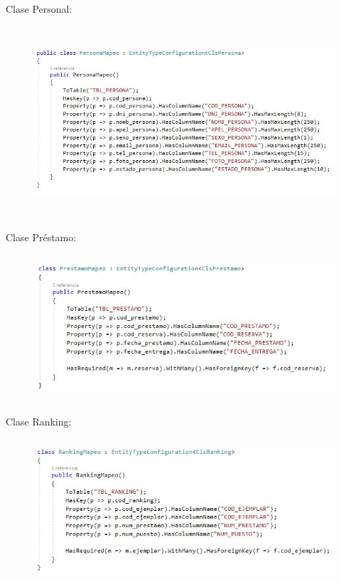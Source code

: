 \documentclass[12pt]{article}
\begin{document}
\begin{enumerate}[label*=\arabic*.]
\begin{enumerate}[label*=\arabic*.]
Clase Personal:
\begin{figure}[H]
	\begin{Center}
		\includegraphics[width=5.91in,height=2.80in]{./media/personalMap.jpg}
	\end{Center}
\end{figure}


Clase Préstamo:
\begin{figure}[H]
	\begin{Center}
		\includegraphics[width=5.91in,height=2.15in]{./media/prestamoMap.jpg}
	\end{Center}
\end{figure}


Clase Ranking:
\begin{figure}[H]
	\begin{Center}
		\includegraphics[width=5.91in,height=2.15in]{./media/rankingMap.jpg}
	\end{Center}
\end{figure}


\end{enumerate}
\end{enumerate}
\end{document}
